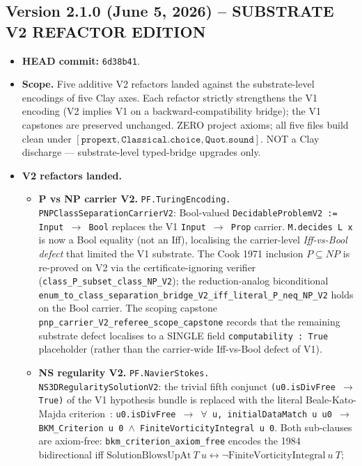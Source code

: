 \subsection*{Version 2.1.0 (June 5, 2026) -- SUBSTRATE V2 REFACTOR EDITION}
\begin{itemize}
\item \textbf{HEAD commit:} \texttt{6d38b41}.
\item \textbf{Scope.} Five additive V2 refactors landed against the
substrate-level encodings of five Clay axes. Each refactor strictly
strengthens the V1 encoding (V2 implies V1 on a backward-compatibility
bridge); the V1 capstones are preserved unchanged. ZERO project
axioms; all five files build clean under
$[\texttt{propext}, \texttt{Classical.choice}, \texttt{Quot.sound}]$.
NOT a Clay discharge --- substrate-level typed-bridge upgrades only.
\item \textbf{V2 refactors landed.}
  \begin{itemize}
  \item \textbf{P vs NP carrier V2.}
  \texttt{PF.TuringEncoding.\\PNPClassSeparationCarrierV2}: Bool-valued
  \texttt{DecidableProblemV2 := Input $\to$ Bool} replaces the V1
  \texttt{Input $\to$ Prop} carrier. \texttt{M.decides L x} is now a
  Bool equality (not an Iff), localising the carrier-level
  \emph{Iff-vs-Bool defect} that limited the V1 substrate. The Cook
  1971 inclusion $P \subseteq NP$ is re-proved on V2 via the
  certificate-ignoring verifier
  (\texttt{class\_P\_subset\_class\_NP\_V2}); the reduction-analog
  biconditional
  \texttt{enum\_to\_class\_separation\_bridge\_V2\_iff\_literal\_P\_neq\_NP\_V2}
  holds on the Bool carrier. The scoping capstone
  \texttt{pnp\_carrier\_V2\_referee\_scope\_capstone} records that the
  remaining substrate defect localises to a SINGLE field
  \texttt{computability~:~True} placeholder (rather than the
  carrier-wide Iff-vs-Bool defect of V1).
  \item \textbf{NS regularity V2.}
  \texttt{PF.NavierStokes.\\NS3DRegularitySolutionV2}: the trivial fifth
  conjunct \texttt{(u0.isDivFree $\to$ True)} of the V1 hypothesis
  bundle is replaced with the literal Beale-Kato-Majda
  criterion~\cite{beale1984}: \texttt{u0.isDivFree $\to$ $\forall$ u,
  initialDataMatch u u0 $\to$ BKM\_Criterion u 0 $\wedge$
  FiniteVorticityIntegral u 0}. Both sub-clauses are axiom-free:
  \texttt{bkm\_criterion\_axiom\_free} encodes the 1984 bidirectional
  iff $\text{SolutionBlowsUpAt}~T~u \leftrightarrow \neg \text{FiniteVorticityIntegral}~u~T$;

\end{itemize}
\end{itemize}
